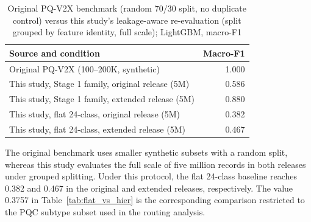 \documentclass{IEEEoj}
\begin{document}
\begin{table}[!t]
\caption{Original PQ-V2X benchmark (random 70/30 split, no duplicate
control) versus this study's leakage-aware re-evaluation (split grouped by
feature identity, full scale); LightGBM, macro-F1}
\label{tab:external_baseline}
\centering
\small
\begin{tabularx}{\columnwidth}{X r}
\toprule
Source and condition & Macro-F1 \\
\midrule
Original PQ-V2X \cite{105018710169} (100--200K, synthetic) & 1.000 \\
\midrule
This study, Stage 1 family, original release (5M) & 0.586 \\
This study, Stage 1 family, extended release (5M) & 0.880 \\
This study, flat 24-class, original release (5M) & 0.382 \\
This study, flat 24-class, extended release (5M) & 0.467 \\
\bottomrule
\end{tabularx}
\end{table}

The original benchmark uses smaller synthetic subsets with a random split,
whereas this study evaluates the full scale of five million records in both
releases under grouped splitting. Under this protocol, the flat 24-class
baseline reaches 0.382 and 0.467 in the original and extended releases,
respectively. The value 0.3757 in Table~\ref{tab:flat_vs_hier} is the
corresponding comparison restricted to the PQC subtype subset used in the
routing analysis.
\end{document}

